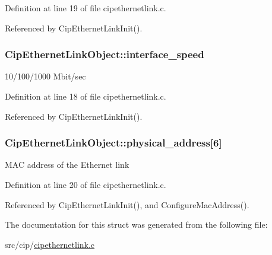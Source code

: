 \-Definition at line 19 of file cipethernetlink.\-c.



\-Referenced by \-Cip\-Ethernet\-Link\-Init().

\hypertarget{structCipEthernetLinkObject_a786d0470c5139d906db04cf338e9e49a}{
\subsubsection[{interface\-\_\-speed}]{ {\bf \-Cip\-Ethernet\-Link\-Object\-::interface\-\_\-speed}}}\label{d8/d13/structCipEthernetLinkObject_a786d0470c5139d906db04cf338e9e49a}
10/100/1000 \-Mbit/sec 

\-Definition at line 18 of file cipethernetlink.\-c.



\-Referenced by \-Cip\-Ethernet\-Link\-Init().

\hypertarget{structCipEthernetLinkObject_a4a91c0cca43031b628001583f6ce3f63}{
\subsubsection[{physical\-\_\-address}]{ {\bf \-Cip\-Ethernet\-Link\-Object\-::physical\-\_\-address}\mbox{[}6\mbox{]}}}\label{d8/d13/structCipEthernetLinkObject_a4a91c0cca43031b628001583f6ce3f63}
\-M\-A\-C address of the \-Ethernet link 

\-Definition at line 20 of file cipethernetlink.\-c.



\-Referenced by \-Cip\-Ethernet\-Link\-Init(), and \-Configure\-Mac\-Address().



\-The documentation for this struct was generated from the following file\-:\begin{DoxyCompactItemize}
\item 
src/cip/\hyperlink{cipethernetlink_8c}{cipethernetlink.\-c}\end{DoxyCompactItemize}
